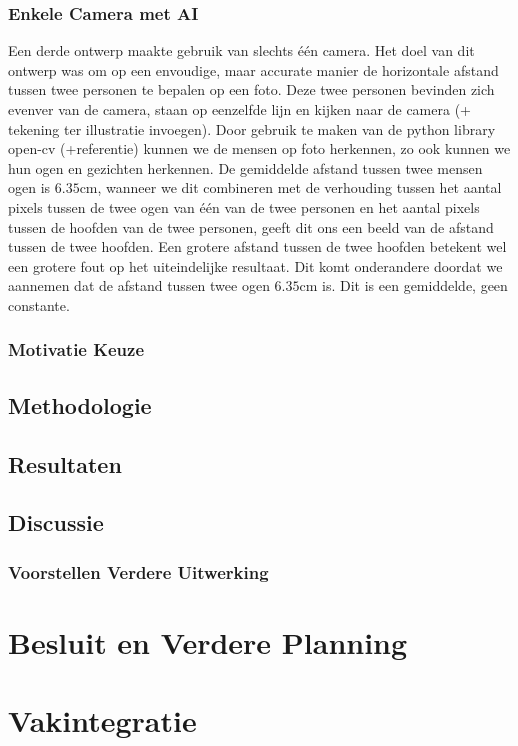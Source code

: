 \documentclass[a4paper,11pt]{article}
\begin{document}
	\subsubsection{Enkele Camera met AI}
		Een derde ontwerp maakte gebruik van slechts één camera. Het doel van dit ontwerp was om op een envoudige, maar accurate manier de horizontale afstand tussen twee personen te bepalen op een foto. Deze twee personen bevinden zich evenver van de camera, staan op eenzelfde lijn en kijken naar de camera (+ tekening ter illustratie invoegen). Door gebruik te maken van de python library open-cv (+referentie) kunnen we de mensen op foto herkennen, zo ook kunnen we hun ogen en gezichten herkennen. De gemiddelde afstand tussen twee mensen ogen is $6.35\text{cm}$, wanneer we dit combineren met de verhouding tussen het aantal pixels tussen de twee ogen van één van de twee personen en het aantal pixels tussen de hoofden van de twee personen, geeft dit ons een beeld van de afstand tussen de twee hoofden. Een grotere afstand tussen de twee hoofden betekent wel een grotere fout op het uiteindelijke resultaat. Dit komt onderandere doordat we aannemen dat de afstand tussen twee ogen $6.35\text{cm}$ is. Dit is een gemiddelde, geen constante.
	\subsubsection{Motivatie Keuze}
	\subsection{Methodologie}
	\subsection{Resultaten}
	\subsection{Discussie}
	\subsubsection{Voorstellen Verdere Uitwerking}
	
	
	
	\section{Besluit en Verdere Planning}
	
	
	
	\section{Vakintegratie}	%
	
\end{document}
